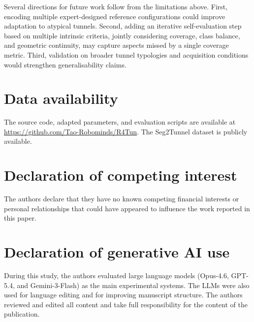 \documentclass[a4paper,fleqn]{cas-dc}
\begin{document}
{Several directions for future work follow from the limitations above. First, encoding multiple expert-designed reference configurations could improve adaptation to atypical tunnels. Second, adding an iterative self-evaluation step based on multiple intrinsic criteria, jointly considering coverage, class balance, and geometric continuity, may capture aspects missed by a single coverage metric. Third, validation on broader tunnel typologies and acquisition conditions would strengthen generalisability claims.


\section*{Data availability}

The source code, adapted parameters, and evaluation scripts are available at \url{https://github.com/Tao-Robominds/R4Tun}. The Seg2Tunnel dataset is publicly available.

\section*{Declaration of competing interest}

The authors declare that they have no known competing financial interests or personal relationships that could have appeared to influence the work reported in this paper.

\section*{Declaration of generative AI use}

During this study, the authors evaluated large language models (Opus-4.6, GPT-5.4, and Gemini-3-Flash) as the main experimental systems. The LLMs were also used for language editing and for improving manuscript structure. The authors reviewed and edited all content and take full responsibility for the content of the publication.



}
\end{document}
